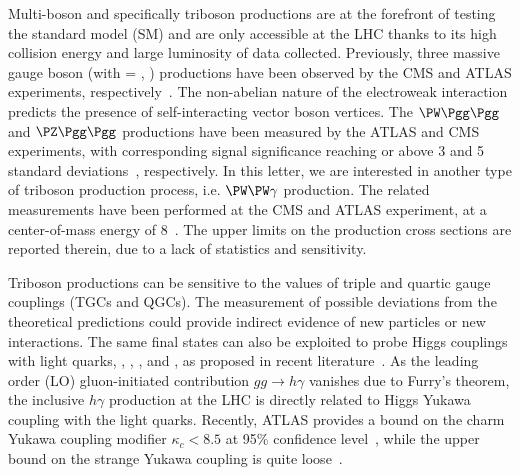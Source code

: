 
\maketitle 

Multi-boson and specifically triboson productions are at the forefront of testing the standard model (SM) and are only accessible at the LHC thanks to its high collision energy and large luminosity of data collected. Previously, three massive gauge boson (\PV\PV\PV with \PV = \PW, \PZ) productions have been observed by the CMS and ATLAS experiments, respectively~\cite{CMS:2020hjs,ATLAS:2021atz}. The non-abelian nature of the electroweak interaction predicts the presence of self-interacting vector boson vertices. The $\PW\Pgg\Pgg$ and $\PZ\Pgg\Pgg$ productions have been measured by the ATLAS and CMS experiments, with corresponding signal significance reaching or above 3 and 5 standard deviations~\cite{ATLAS:2015ify,ATLAS:2016qjc,CMS:2017tzy,CMS:2021jji}, respectively. In this letter, we are interested in another type of triboson production process, i.e. $\PW\PW\gamma$ production. The related measurements have been performed at the CMS and ATLAS experiment, at a center-of-mass energy of 8\TeV~\cite{CMS:2014cdf,ATLAS:2017bon}. The upper limits on the production cross sections are reported therein, due to a lack of statistics and sensitivity.

Triboson productions can be sensitive to the values of triple and quartic gauge couplings (TGCs and QGCs). The measurement of possible deviations from the theoretical predictions could provide indirect evidence of new particles or new interactions. The same final states can also be exploited to probe Higgs couplings with light quarks, \PQc, \PQs, \PQu, and \PQd, as proposed in recent literature~\cite{Khanpour:2017inb,Aguilar-Saavedra:2020rgo,Falkowski:2020znk}. As the leading order (LO) gluon-initiated contribution $gg\rightarrow h\gamma$ vanishes due to Furry’s theorem, the inclusive $h\gamma$ production at the LHC is directly related to Higgs Yukawa coupling with the light quarks. Recently, ATLAS provides a bound on the charm Yukawa coupling modifier $\kappa_c<8.5$ at 95\% confidence level~\cite{ATLAS:2021zwx}, while the upper bound on the strange Yukawa coupling is quite loose~\cite{Duarte-Campderros:2018ouv,ATLAS:2018xfc}.

